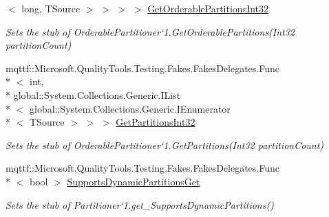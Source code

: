 \begin{DoxyCompactItemize}
$<$ long, T\-Source $>$ $>$ $>$ $>$ \hyperlink{class_system_1_1_collections_1_1_concurrent_1_1_fakes_1_1_stub_orderable_partitioner_3_01_t_source_01_4_af9c43b369e13c6633fde1b15bff6f798}{Get\-Orderable\-Partitions\-Int32}
\begin{DoxyCompactList}\small\item\em Sets the stub of Orderable\-Partitioner`1.Get\-Orderable\-Partitions(\-Int32 partition\-Count)\end{DoxyCompactList}\item 
mqttf\-::\-Microsoft.\-Quality\-Tools.\-Testing.\-Fakes.\-Fakes\-Delegates.\-Func\\*
$<$ int, \\*
global\-::\-System.\-Collections.\-Generic.\-I\-List\\*
$<$ global\-::\-System.\-Collections.\-Generic.\-I\-Enumerator\\*
$<$ T\-Source $>$ $>$ $>$ \hyperlink{class_system_1_1_collections_1_1_concurrent_1_1_fakes_1_1_stub_orderable_partitioner_3_01_t_source_01_4_a06bd5c6e9599ee899d64054ec7064363}{Get\-Partitions\-Int32}
\begin{DoxyCompactList}\small\item\em Sets the stub of Orderable\-Partitioner`1.Get\-Partitions(\-Int32 partition\-Count)\end{DoxyCompactList}\item 
mqttf\-::\-Microsoft.\-Quality\-Tools.\-Testing.\-Fakes.\-Fakes\-Delegates.\-Func\\*
$<$ bool $>$ \hyperlink{class_system_1_1_collections_1_1_concurrent_1_1_fakes_1_1_stub_orderable_partitioner_3_01_t_source_01_4_a894b1ce59b770a2afacaa8d744ed5f42}{Supports\-Dynamic\-Partitions\-Get}
\begin{DoxyCompactList}\small\item\em Sets the stub of Partitioner`1.get\-\_\-\-Supports\-Dynamic\-Partitions()\end{DoxyCompactList}\end{DoxyCompactItemize}
